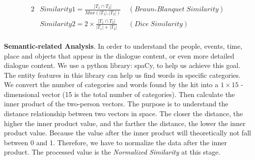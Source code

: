\documentclass[a4paper,12pt]{report}
\begin{document}
\begin{alignat}{2}
&Similarity1=\frac{|T_1\cap T_2 |}{Max(|T_1|,|T_2|)}\; &(Braun\frac{\;}{\;}Blanquet\;Similarity) 
\label{e:similarity1}\\  
 &Similarity2=2 \times \frac{|T_1\cap T_2 |}{|T_1|+|T_2|}\;&(Dice\;Similarity)
\label{e:similarity2}
\end{alignat}


\paragraph{}
\textbf{Semantic-related Analysis}. In order to understand the people, events, time, place and objects that appear in the dialogue content, or even more detailed dialogue content. We use a python library: spaCy, to help us achieve this goal. The entity features in this library can help us find words in specific categories. We convert the number of categories and words found by the kit into a $1\times15$ -dimensional vector (15 is the total number of categories). Then calculate the inner product of the two-person vectors. The purpose is to understand the distance relationship between two vectors in space. The closer the distance, the higher the inner product value, and the farther the distance, the lower the inner product value. Because the value after the inner product will theoretically not fall between 0 and 1. Therefore, we have to normalize the data after the inner product. The processed value is the \emph{Normalized Similarity} at this stage.
\end{document}

